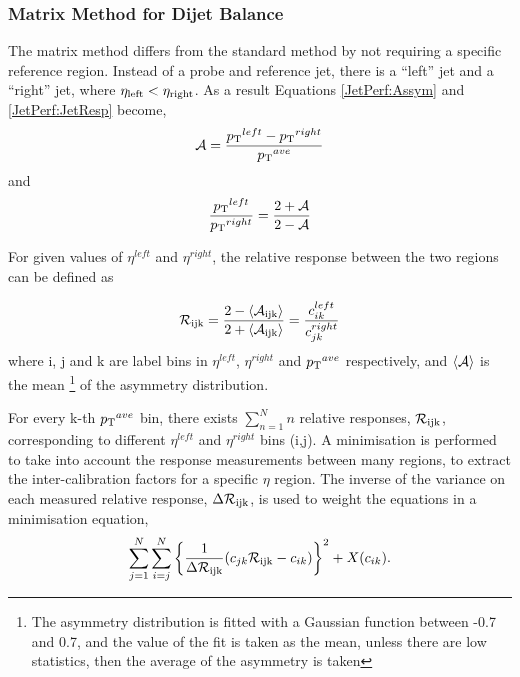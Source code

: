 \subsubsection{Matrix Method for Dijet Balance}

The matrix method differs from the standard method by not requiring a specific reference region.
Instead of a probe and reference jet, there is a ``left'' jet and a ``right'' jet, where $\eta_{\rm left}<\eta_{\rm right}$.
As a result Equations \ref{JetPerf:Assym} and \ref{JetPerf:JetResp} become,
\begin{equation}
\mathcal{A} =\frac{\mbox{$p_{\rm T}$}{}^{left} - \mbox{$p_{\rm T}$}{}^{right}}{\mbox{$\mbox{$p_{\rm T}$}{}^{ave}$}{}}
\label{JetPerf:MM_Assym}
\end{equation}
and 
\begin{equation}
\frac{\mbox{$p_{\rm T}$}{}^{left}}{\mbox{$p_{\rm T}$}{}^{right}}=\frac{2+\mathcal{A}}{2-\mathcal{A}}
\label{JetPerf:MM_CorrectionFactor}
\end{equation}

For given values of $\eta^{left}$ and $\eta^{right}$, the relative response between the two regions can be defined as 

\begin{equation}
\mathcal{R_{\rm ijk}}= \frac{2-\mbox{$\langle \mathcal{A_{\rm ijk}} \rangle$}}{2+\mbox{$\langle \mathcal{A_{\rm ijk}} \rangle$}} = \frac{ c_{ik}^{left}}{ c_{jk}^{right}}
\label{JetPerf:MM_Response_Measured}
\end{equation}
where i, j and k are label bins in  $\eta^{left}$, $\eta^{right}$ and $\mbox{$\mbox{$p_{\rm T}$}{}^{ave}$}{}$ respectively, and $\mbox{$\langle \mathcal{A} \rangle$}$ is the mean \footnote{The asymmetry distribution is fitted with a Gaussian function between -0.7 and 0.7, and the value of the fit is taken as the mean, unless there are low statistics, then the average of the asymmetry is taken} of the asymmetry distribution. 


For every k-th $\mbox{$\mbox{$p_{\rm T}$}{}^{ave}$}{}$ bin, there exists $\sum\limits^N_{n=1}n$ relative responses, $\mathcal{R_{\rm ijk}}$, corresponding to different $\eta^{left}$ and $\eta^{right}$ bins (i,j).
A minimisation is performed to take into account the response measurements between many regions, to extract the inter-calibration factors for a specific $\eta$ region.
The inverse of the variance on each measured relative response, $\Delta\mathcal{R_{\rm ijk}}$, is used to weight the equations in a minimisation equation,
\begin{equation}
\sum\limits^N_{j=1} \sum\limits^N_{i=j}\left\{\frac{1}{\Delta\mathcal{R_{\rm ijk}}}( c_{jk}\mathcal{R_{\rm ijk}}- c_{ik} )\right\}^2 + X(c_{ik}).
\label{JetPerf:MM_Final}
\end{equation}

